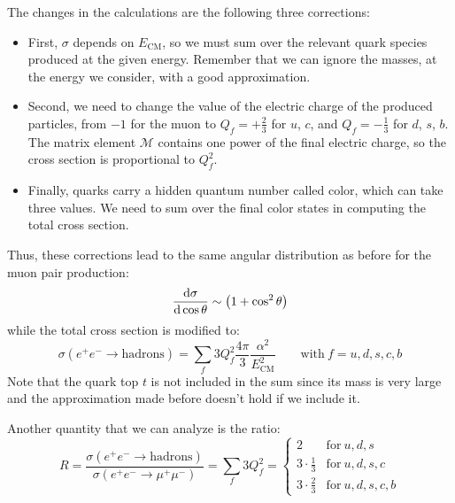 \documentclass[../../main/main.tex]{subfiles}
\begin{document}
The changes in the calculations are the following three corrections:
\begin{itemize}
	\item First, \( \sigma \) depends on \( E_\mathrm{CM} \), so we must sum over the relevant quark species produced at the given energy. Remember that we can ignore the masses, at the energy we consider, with a good approximation.
	\item Second, we need to change the	value of the electric charge of the produced particles, from \( -1 \) for the muon to \( Q_f = + \frac{2}{3} \) for \( u \), \( c \), and \( Q_f = - \frac{1}{3} \) for \( d \), \( s \), \( b \). The matrix element \( \mathcal{M} \) contains one power of the final electric charge, so the cross section is proportional to \( Q^2_f \).
	\item Finally, quarks carry a hidden quantum number called color, which can take three values. We need to sum over the final color states in computing the total cross section.
\end{itemize}
Thus, these corrections lead to the same angular distribution as before for the muon pair production:
\begin{equation}
	\dv{\sigma}{\cos \theta} (e^+e^- \longrightarrow \text{hadrons})
	\sim
	\qty(1 + \cos^2 \theta)
	\label{eq:L07_HPDCS}
\end{equation}
while the total cross section is modified to:
\begin{equation}
	\sigma(e^+e^- \longrightarrow \text{hadrons})
	=
	\sum_{f} 3 Q_f^2 \frac{4\pi}{3} \frac{\alpha^2}{E^2_\mathrm{CM}}
	\qquad
	\text{with} \ f = u, d, s, c, b
	\label{eq:L07_HPCS}
\end{equation}
Note that the quark top \( t \) is not included in the sum since its mass is very large and the approximation made before doesn't hold if we include it.

Another quantity that we can analyze is the ratio:
\begin{equation}
	R
	=
	\frac{\sigma(e^+e^- \longrightarrow \text{hadrons})}{\sigma(e^+e^- \longrightarrow \mu^+\mu^-)}
	=
	\sum_{f} 3 Q^2_f
	=
	\begin{cases}
		2					&	\text{for} \ u,d,s		\\
		3 \cdot \frac{1}{3}	&	\text{for} \ u,d,s,c	\\
		3 \cdot \frac{2}{3}	&	\text{for} \ u,d,s,c,b
	\end{cases}
	\label{eq:L07_HPR}
\end{equation}
\end{document}
